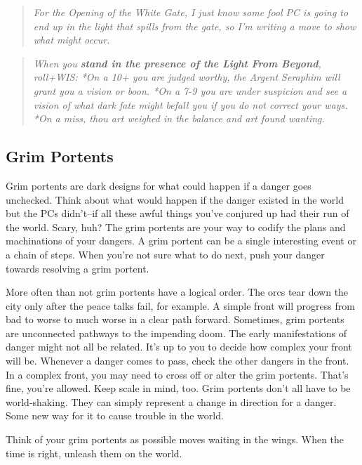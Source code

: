\begin{quote}
\emph{For the Opening of the White Gate, I just know some fool PC is going to end up in the light that spills from the gate, so I'm writing a move to show what might occur.}
\end{quote}


\begin{quote}
\emph{When you \textbf{stand in the presence of the Light From Beyond}, roll+WIS: *On a 10+ you are judged worthy, the Argent Seraphim will grant you a vision or boon. *On a 7-9 you are under suspicion and see a vision of what dark fate might befall you if you do not correct your ways. *On a miss, thou art weighed in the balance and art found wanting.}
\end{quote}
\subsection{Grim Portents}


 Grim portents are dark designs for what could happen if a danger goes unchecked. Think about what would happen if the danger existed in the world but the PCs didn't--if all these awful things you've conjured up had their run of the world. Scary, huh? The grim portents are your way to codify the plans and machinations of your dangers. A grim portent can be a single interesting event or a chain of steps. When you're not sure what to do next, push your danger towards resolving a grim portent.


 More often than not grim portents have a logical order. The orcs tear down the city only after the peace talks fail, for example. A simple front will progress from bad to worse to much worse in a clear path forward. Sometimes, grim portents are unconnected pathways to the impending doom. The early manifestations of danger might not all be related. It's up to you to decide how complex your front will be. Whenever a danger comes to pass, check the other dangers in the front. In a complex front, you may need to cross off or alter the grim portents. That's fine, you're allowed. Keep scale in mind, too. Grim portents don't all have to be world-shaking. They can simply represent a change in direction for a danger. Some new way for it to cause trouble in the world.


 Think of your grim portents as possible moves waiting in the wings. When the time is right, unleash them on the world.


